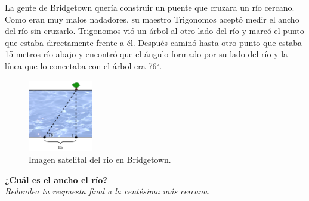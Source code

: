 La gente de Bridgetown quería construir un puente que cruzara un río cercano.
Como eran muy malos nadadores, su maestro Trigonomos aceptó medir el ancho del río sin cruzarlo.
Trigonomos vió un árbol al otro lado del río y marcó el punto que estaba directamente frente a él.
Después caminó hasta otro punto que estaba 15 metros río abajo y encontró que el ángulo formado
por su lado del río y la línea que lo conectaba con el árbol era 76$^\circ$.\\
\begin{figure}[H]
    \begin{center}
        \includegraphics[width=0.25\textwidth]{../images/river2.png}
    \end{center}
    \caption{Imagen satelital del rio en Bridgetown.}
    \label{fig:river2}
\end{figure}
\textbf{¿Cuál es el ancho el río?}\\
\textit{Redondea tu respuesta final a la centésima más cercana.}